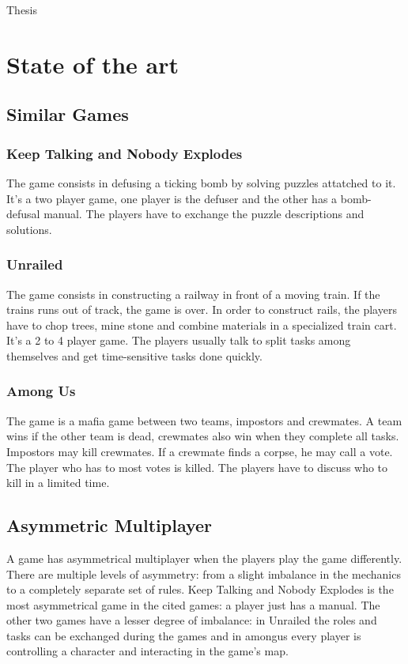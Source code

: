 \documentclass{article}
\begin{document}
\setlength{\parindent}{0in}

\begin {center}
\large Thesis
\end{center}

\section{State of the art}
\subsection{Similar Games}
\subsubsection{Keep Talking and Nobody Explodes}
The game consists in defusing a ticking bomb by solving puzzles attatched to it. It's a two player game, one player is the defuser and the other has a bomb-defusal manual. The players have to exchange the puzzle descriptions and solutions. 
\subsubsection{Unrailed}
The game consists in constructing a railway in front of a moving train. If the trains runs out of track, the game is over. In order to construct rails, the players have to chop trees, mine stone and combine materials in a specialized train cart. It's a 2 to 4 player game. The players  usually talk to split tasks among themselves and get time-sensitive tasks done quickly.
\subsubsection{Among Us}
The game is a mafia game between two teams, impostors and crewmates. A team wins if the other team is dead, crewmates also win when they complete all tasks. Impostors may kill crewmates. If a crewmate finds a corpse, he may call a vote. The player who has to most votes is killed. The players have to discuss who to kill in a limited time.
\subsection{Asymmetric Multiplayer}
A game has asymmetrical multiplayer when the players play the game differently. There are multiple levels of asymmetry: from a slight imbalance in the mechanics to a completely separate set of rules. Keep Talking and Nobody Explodes is the most asymmetrical game in the cited games: a player just has a manual. The other two games have a lesser degree of imbalance: in Unrailed the roles and tasks can be exchanged during the games and in amongus every player is controlling a character and interacting in the game's map.
\end{document}
